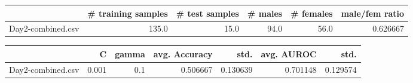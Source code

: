 \begin{tabular}{lrrrrr}
\hline
{} &  \# training samples &  \# test samples &  \# males &  \# females &  male/fem ratio \\
\hline
Day2-combined.csv &               135.0 &            15.0 &     94.0 &       56.0 &        0.626667 \\
\hline
\end{tabular}
\begin{tabular}{lrrrrrr}
\hline
{} &      C &  gamma &  avg. Accuracy &      std. &  avg. AUROC &      std. \\
\hline
Day2-combined.csv &  0.001 &    0.1 &       0.506667 &  0.130639 &    0.701148 &  0.129574 \\
\hline
\end{tabular}
